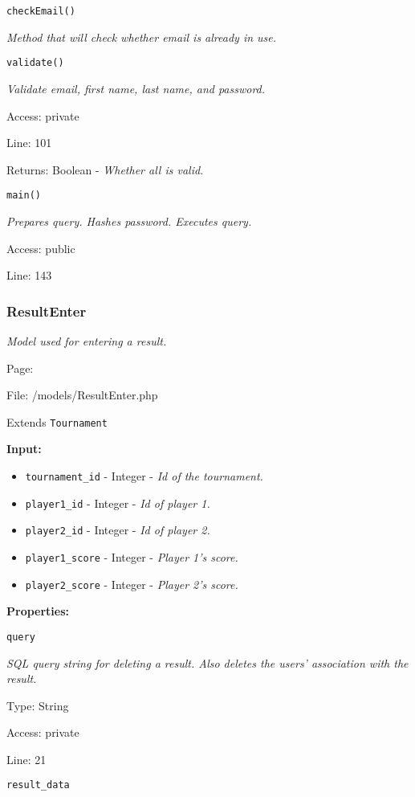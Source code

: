 \texttt{checkEmail()}

{\scriptsize
\textit{Method that will check whether email is already in use.}

}

\texttt{validate()}

{\scriptsize
\textit{Validate email, first name, last name, and password.}

Access: private

Line: 101

Returns: Boolean - \textit{Whether all is valid.}

}

\texttt{main()}

{\scriptsize
\textit{Prepares query.
Hashes password.
Executes query.}

Access: public

Line: 143

}

\subsubsection{ResultEnter}\label{ResultEnter.php.doc}
\textit{Model used for entering a result.}

Page: \pageref{ResultEnter.php}

File: /models/ResultEnter.php

Extends \texttt{Tournament}

\textbf{Input:}
\begin{itemize}
\item \texttt{tournament\_id} - Integer - \textit{Id of the tournament.}
\item \texttt{player1\_id} - Integer - \textit{Id of player 1.}
\item \texttt{player2\_id} - Integer - \textit{Id of player 2.}
\item \texttt{player1\_score} - Integer - \textit{Player 1's score.}
\item \texttt{player2\_score} - Integer - \textit{Player 2's score.}
\end{itemize}

\textbf{Properties:}

\texttt{query}

{\scriptsize
\textit{SQL query string for deleting a result.
Also deletes the users' association with the result.}

Type: String

Access: private

Line: 21

}
\texttt{result\_data}


